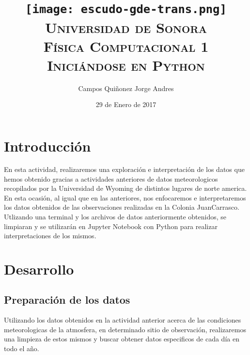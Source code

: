 \documentclass{article}
\begin{document}
\begin{doublespace}
\title{\texttt{[image: escudo-gde-trans.png]}\\ \textsc{\LARGE Universidad de Sonora\\Física Computacional 1\\Iniciándose en Python}}
\author{\huge Campos Quiñonez Jorge Andres}
\date{\Large 29 de Enero de 2017}
\maketitle

\end{doublespace}

\newpage
\mbox{}
\thispagestyle{empty}
\newpage
\tableofcontents
\newpage
\section{\huge Introducción}
\large En esta actividad, realizaremos una exploración e interpretación de los datos que hemos obtenido gracias a actividades anteriores de datos meteorologicos recopilados por la Universidad de Wyoming de distintos lugares de norte america. En esta ocasión, al igual que en las anteriores, nos enfocaremos e interpretaremos los datos obtenidos de las observaciones realizadas en la Colonia JuanCarrasco. Utlizando una terminal y los archivos de datos anteriormente obtenidos, se limpiaran y se utilizarán en Jupyter Notebook con Python para realizar interpretaciones de los mismos.

\newpage
\section{\huge Desarrollo}
\subsection{\LARGE Preparación de los datos}
\bigskip
Utilizando los datos obtenidos en la actividad anterior acerca de las condiciones meteorologicas de la atmosfera, en determinado sitio de observación, realizaremos una limpieza de estos mismos y buscar obtener datos especificos de cada día en todo el año.\\
\end{document}
